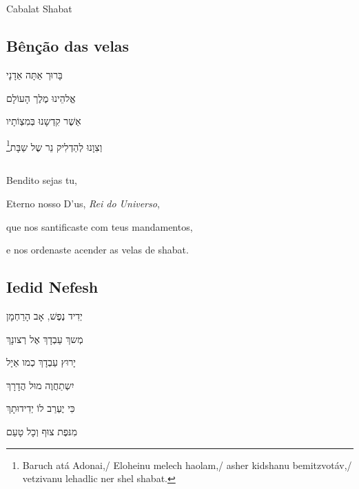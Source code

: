 \chapter*{}
\begin{center}
\begin{vplace}[0.3]
\Large
Cabalat Shabat
\end{vplace}
\end{center}
\thispagestyle{empty}


\movetoevenpage
\raggedleft

\section{Bênção das velas}

בָּרוּך אַתָּה אַדָנָי

אֱלהֵינוּ מֶלֶך הָעוֹלָם

אַשֶׁר קִדְשָנוּ בְּמִצְוֹתָיו

וְצִוָנוּ לְהַדְלִיק נֵר שֶל שַבָּת‏\footnote{Baruch atá Adonai,/ Eloheinu melech haolam,/ asher kidshanu bemitzvotáv,/ vetzivanu lehadlic ner shel shabat.}

\movetooddpage
\raggedright

\section{}

Bendito sejas tu,

Eterno nosso D'us, \emph{Rei do Universo},

que nos santificaste com teus mandamentos,

e nos ordenaste acender as velas de shabat.

\movetoevenpage
\raggedleft

\section{Iedid Nefesh}

יְדִיד נֶפֶשׁ, אָב הָרַחְמָן

מְשךְ עַבְדָךְ אֶל רְצונָךְ

יָרוּץ עַבְדָךְ כְמו אַיָל

יִשְתַחֲוֶה מוּל הֲדָרָךְ

כִּי יֶעְרַב לוֹ יְדִידוּתָךְ

מִנּפֶת צוּף וְכָל טָעַם\\[10pt]

